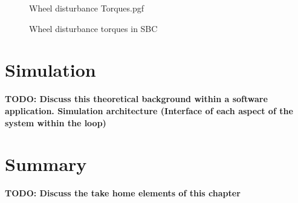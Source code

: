 \begin{figure}[!htb]
	\centering
	\def\pgfwidth{10cm}
	{Wheel disturbance Torques.pgf}
	
	\caption{Wheel disturbance torques in SBC}
	\label{fig:Wheel disturbance Torques}
\end{figure}

\section{Simulation}
\textbf{TODO: Discuss this theoretical background within a software application. Simulation architecture (Interface of each aspect of the system within the loop)}

\section{Summary}
\textbf{TODO: Discuss the take home elements of this chapter}